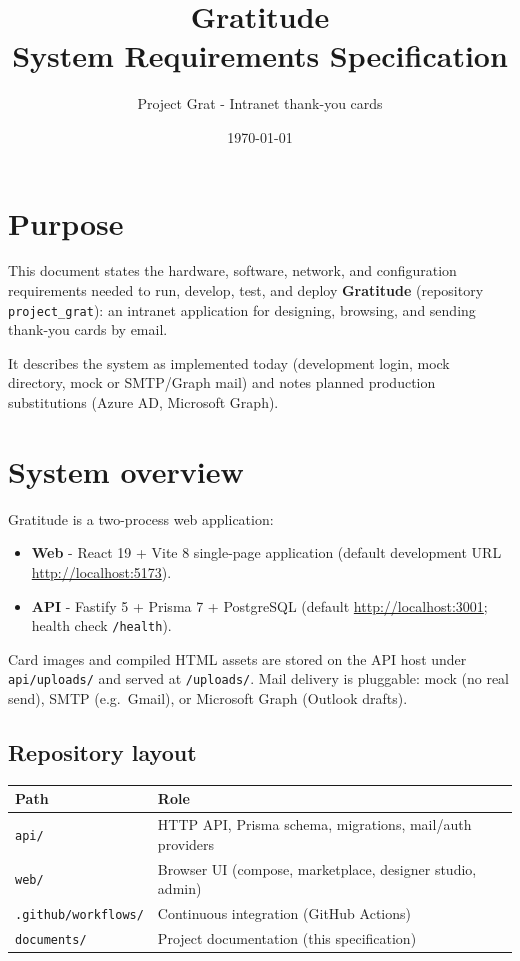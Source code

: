 \documentclass[11pt,a4paper]{article}
\title{\textbf{Gratitude}\\[0.4em]
\large System Requirements Specification}
\author{Project Grat - Intranet thank-you cards}
\date{\today}
\begin{document}
\maketitle
\tableofcontents
\newpage

\section{Purpose}
This document states the hardware, software, network, and configuration requirements needed to run, develop, test, and deploy \textbf{Gratitude} (repository \texttt{project\_grat}): an intranet application for designing, browsing, and sending thank-you cards by email.

It describes the system as implemented today (development login, mock directory, mock or SMTP/Graph mail) and notes planned production substitutions (Azure AD, Microsoft Graph).

\section{System overview}
Gratitude is a two-process web application:

\begin{itemize}[leftmargin=1.4em]
  \item \textbf{Web} - React 19 + Vite 8 single-page application (default development URL \url{http://localhost:5173}).
  \item \textbf{API} - Fastify 5 + Prisma 7 + PostgreSQL (default \url{http://localhost:3001}; health check \texttt{/health}).
\end{itemize}

Card images and compiled HTML assets are stored on the API host under \texttt{api/uploads/} and served at \texttt{/uploads/}. Mail delivery is pluggable: mock (no real send), SMTP (e.g.\ Gmail), or Microsoft Graph (Outlook drafts).

\subsection{Repository layout}
\begin{tabularx}{\textwidth}{lX}
  \toprule
  \textbf{Path} & \textbf{Role} \\
  \midrule
  \texttt{api/} & HTTP API, Prisma schema, migrations, mail/auth providers \\
  \texttt{web/} & Browser UI (compose, marketplace, designer studio, admin) \\
  \texttt{.github/workflows/} & Continuous integration (GitHub Actions) \\
  \texttt{documents/} & Project documentation (this specification) \\
  \bottomrule
\end{tabularx}
\end{document}
